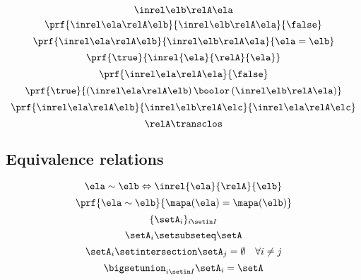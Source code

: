 \begin{forslides}
\begin{equation}
{        }{
            \inrel \elb \relA \ela
        }
\end{equation}
 \begin{equation}\label{eq:slides_session2_151}
\prf{
            \inrel \ela \relA \elb
        }{
            \inrel \elb \relA \ela
        }{
            \false
        }
\end{equation}
\begin{equation}\label{eq:slides_session2_152}
\prf{
            \inrel \ela \relA \elb
        }{
            \inrel \elb \relA \ela
        }{
            \ela = \elb
        }
\end{equation}
 \begin{equation}\label{eq:slides_session2_153}
\prf{\true}{\inrel{\ela}{\relA}{\ela}}
\end{equation}
\begin{equation}\label{eq:slides_session2_154}
\prf{
            \inrel \ela \relA \ela
        }{
            \false
        }
\end{equation}
 \begin{equation}\label{eq:slides_session2_155}
\prf{
            \true
        }{
            (\inrel\ela\relA\elb )\,\boolor\, (\inrel\elb\relA\ela)
        }
\end{equation}
\begin{equation}\label{eq:slides_session2_156}
\prf{
            \inrel \ela \relA \elb
        }{
            \inrel \elb \relA \elc
        }{
            \inrel \ela \relA \elc
        }
\end{equation}
 \begin{equation}\label{eq:slides_session2_157}
\relA\transclos
\end{equation}

\subsection{Equivalence relations}

\begin{equation}\label{eq:slides_session2_158}
\ela\sim \elb \Leftrightarrow \inrel{\ela}{\relA}{\elb}
\end{equation}
 \begin{equation}\label{eq:slides_session2_159}
\prf{
            \ela\sim \elb
        }{
            \mapa(\ela)=\mapa(\elb)
        }
\end{equation}
\begin{equation}\label{eq:slides_session2_160}
\{\setA_i\}_{i\setin I}
\end{equation}
 \begin{equation}\label{eq:slides_session2_161}
\setA_i\setsubseteq \setA
\end{equation}
\begin{equation}\label{eq:slides_session2_162}
\setA_i\setintersection \setA_j=\emptyset \quad \forall i\neq j
\end{equation}
 \begin{equation}\label{eq:slides_session2_163}
\bigsetunion_{i\setin I}\setA_i=\setA
\end{equation}


\end{forslides}
